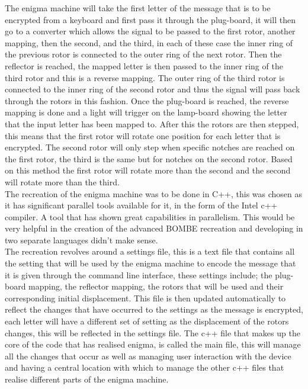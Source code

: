 \documentclass[12pt,a4paper]{article}
\begin{document}
The enigma machine will take the first letter of the message that is to be encrypted from a keyboard and first pass it through the plug-board, it will then go to a converter which allows the signal to be passed to the first rotor, another mapping, then the second, and the third, in each of these case the inner ring of the previous rotor is connected to the outer ring of the next rotor. Then the reflector is reached, the mapped letter is then passed to the inner ring of the third rotor and this is a reverse mapping. The outer ring of the third rotor is connected to the inner ring of the second rotor and thus the signal will pass back through the rotors in this fashion. Once the plug-board is reached, the reverse mapping is done and a light will trigger on the lamp-board showing the letter that the input letter has been mapped to. After this the rotors are then stepped, this means that the first rotor will rotate one position for each letter that is encrypted. The second rotor will only step when specific notches are reached on the first rotor, the third is the same but for notches on the second rotor. Based on this method the first rotor will rotate more than the second and the second will rotate more than the third.\\

The recreation of the enigma machine was to be done in C++, this was chosen as it has significant parallel tools available for it, in the form of the Intel c++ compiler. A tool that has shown great capabilities in parallelism. This would be very helpful in the creation of the advanced BOMBE recreation and developing in two separate languages didn't make sense.\\

The recreation revolves around a settings file, this is a text file that contains all the setting that will be used by the enigma machine to encode the message that it is given through the command line interface, these settings include; the plug-board mapping, the reflector mapping, the rotors that will be used and their corresponding initial displacement. This file is then updated automatically to reflect the changes that have occurred to the settings as the message is encrypted, each letter will have a different set of setting as the displacement of the rotors changes, this will be reflected in the settings file. The c++ file that makes up the core of the code that has realised enigma, is called the main file, this will manage all the changes that occur as well as managing user interaction with the device and having a central location with which to manage the other c++ files that realise different parts of the enigma machine.\\
\end{document}
